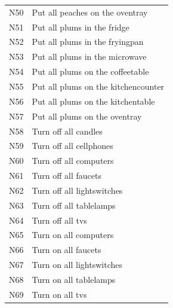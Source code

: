 {\begin{longtable}{lp{.85\linewidth}}
N50 & Put all peaches on the oventray \\
N51 & Put all plums in the fridge \\
N52 & Put all plums in the fryingpan \\
N53 & Put all plums in the microwave \\
N54 & Put all plums on the coffeetable \\
N55 & Put all plums on the kitchencounter \\
N56 & Put all plums on the kitchentable \\
N57 & Put all plums on the oventray \\
N58 & Turn off all candles \\
N59 & Turn off all cellphones \\
N60 & Turn off all computers \\
N61 & Turn off all faucets \\
N62 & Turn off all lightswitches \\
N63 & Turn off all tablelamps \\
N64 & Turn off all tvs \\
N65 & Turn on all computers \\
N66 & Turn on all faucets \\
N67 & Turn on all lightswitches \\
N68 & Turn on all tablelamps \\
N69 & Turn on all tvs \\
\end{longtable}}

